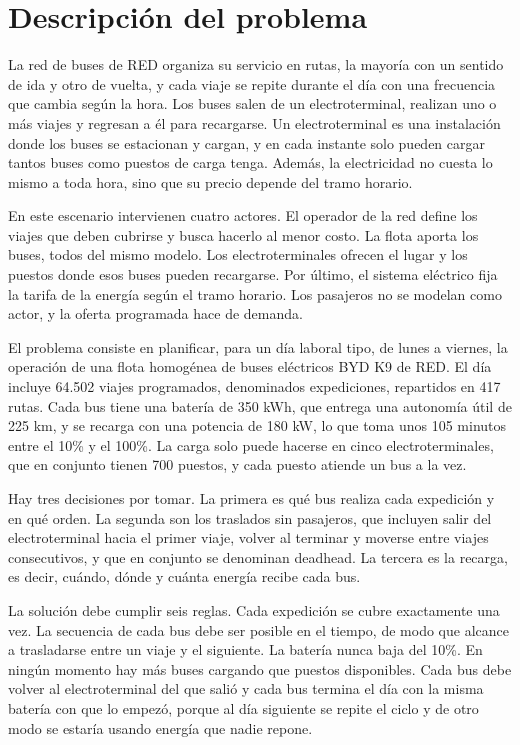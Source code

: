 \section{Descripción del problema}


La red de buses de RED organiza su servicio en rutas, la mayoría con un sentido de ida y otro de vuelta, y cada viaje se repite durante el día con una frecuencia que cambia según la hora. Los buses salen de un electroterminal, realizan uno o más viajes y regresan a él para recargarse. Un electroterminal es una instalación donde los buses se estacionan y cargan, y en cada instante solo pueden cargar tantos buses como puestos de carga tenga. Además, la electricidad no cuesta lo mismo a toda hora, sino que su precio depende del tramo horario.

En este escenario intervienen cuatro actores. El operador de la red define los viajes que deben cubrirse y busca hacerlo al menor costo. La flota aporta los buses, todos del mismo modelo. Los electroterminales ofrecen el lugar y los puestos donde esos buses pueden recargarse. Por último, el sistema eléctrico fija la tarifa de la energía según el tramo horario. Los pasajeros no se modelan como actor, y la oferta programada hace de demanda.

El problema consiste en planificar, para un día laboral tipo, de lunes a viernes, la operación de una flota homogénea de buses eléctricos BYD K9 de RED. El día incluye 64.502 viajes programados, denominados expediciones, repartidos en 417 rutas. Cada bus tiene una batería de 350 kWh, que entrega una autonomía útil de 225 km, y se recarga con una potencia de 180 kW, lo que toma unos 105 minutos entre el 10\% y el 100\%. La carga solo puede hacerse en cinco electroterminales, que en conjunto tienen 700 puestos, y cada puesto atiende un bus a la vez.

Hay tres decisiones por tomar. La primera es qué bus realiza cada expedición y en qué orden. La segunda son los traslados sin pasajeros, que incluyen salir del electroterminal hacia el primer viaje, volver al terminar y moverse entre viajes consecutivos, y que en conjunto se denominan deadhead. La tercera es la recarga, es decir, cuándo, dónde y cuánta energía recibe cada bus.

La solución debe cumplir seis reglas. Cada expedición se cubre exactamente una vez. La secuencia de cada bus debe ser posible en el tiempo, de modo que alcance a trasladarse entre un viaje y el siguiente. La batería nunca baja del 10\%. En ningún momento hay más buses cargando que puestos disponibles. Cada bus debe volver al electroterminal del que salió y cada bus termina el día con la misma batería con que lo empezó, porque al día siguiente se repite el ciclo y de otro modo se estaría usando energía que nadie repone.

